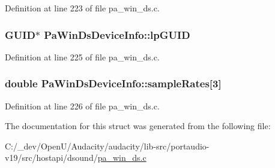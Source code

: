Definition at line 223 of file pa\+\_\+win\+\_\+ds.\+c.

\subsubsection[{\texorpdfstring{lp\+G\+U\+ID}{lpGUID}}]{\setlength{\rightskip}{0pt plus 5cm}G\+U\+ID$\ast$ Pa\+Win\+Ds\+Device\+Info\+::lp\+G\+U\+ID}\hypertarget{struct_pa_win_ds_device_info_aa3d7e46d828264cd3dc72c3e9c748178}{}\label{struct_pa_win_ds_device_info_aa3d7e46d828264cd3dc72c3e9c748178}


Definition at line 225 of file pa\+\_\+win\+\_\+ds.\+c.

\subsubsection[{\texorpdfstring{sample\+Rates}{sampleRates}}]{\setlength{\rightskip}{0pt plus 5cm}double Pa\+Win\+Ds\+Device\+Info\+::sample\+Rates\mbox{[}3\mbox{]}}\hypertarget{struct_pa_win_ds_device_info_a975821036d5c630b8f5f3b1a9db1c397}{}\label{struct_pa_win_ds_device_info_a975821036d5c630b8f5f3b1a9db1c397}


Definition at line 226 of file pa\+\_\+win\+\_\+ds.\+c.



The documentation for this struct was generated from the following file\+:\begin{DoxyCompactItemize}
\item 
C\+:/\+\_\+dev/\+Open\+U/\+Audacity/audacity/lib-\/src/portaudio-\/v19/src/hostapi/dsound/\hyperlink{pa__win__ds_8c}{pa\+\_\+win\+\_\+ds.\+c}\end{DoxyCompactItemize}
